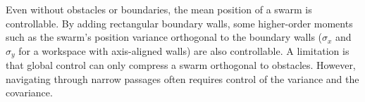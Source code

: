 Even without obstacles or boundaries, the mean position of a swarm is controllable.  By adding rectangular boundary walls, some higher-order moments such as the swarm's position variance orthogonal to the boundary walls ($\sigma_x$ and $\sigma_y$ for a workspace with axis-aligned walls) are also controllable. 
A limitation is that global control can only compress a swarm orthogonal to obstacles.  However, navigating through narrow passages often requires control of the variance and the covariance.

